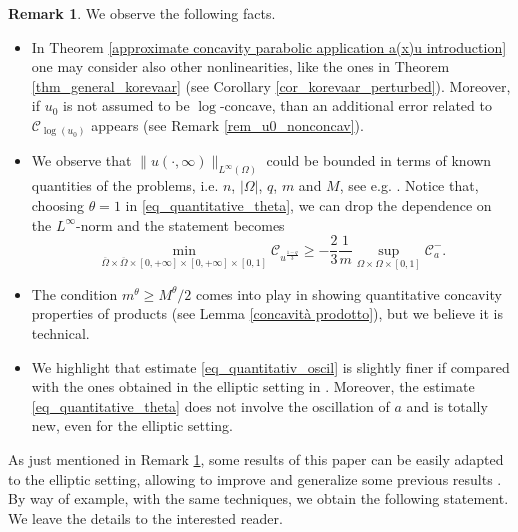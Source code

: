 \documentclass[11pt, reqno]{amsart}
\theoremstyle{definition}
\newtheorem{remark}[lemma]{Remark}
\numberwithin{equation}{section}
\newcommand{\Omegabar}{\overline{\Omega}}
\newcommand{\mc}[1]{\mathcal{#1}}
\def\norm#1{\|#1\|}
\begin{document}
\begin{remark}\label{rmk quantitative concavity introduction}
We observe the following facts.
\begin{itemize}
\item In Theorem \ref{approximate concavity parabolic application a(x)u introduction} one may consider also other nonlinearities, like the ones in Theorem \ref{thm_general_korevaar} (see Corollary \ref{cor_korevaar_perturbed}).
Moreover, if $u_0$ is not assumed to be $\log$-concave, than an additional error related to $\mc{C}_{\log(u_0)}$ appears (see Remark \ref{rem_u0_nonconcav}).
\item 
We observe that $ \norm{u(\cdot, \infty)}_{L^{\infty}(\Omega)}$ could be bounded in terms of known quantities of the problems, i.e. $n$, $|\Omega|$, $q$, $m$ and $M$, see e.g. \cite[proof of Corollary 1.4(b)]{Ciraolo-Cozzi-Perugini-Pollastro}.
Notice that, choosing $\theta=1$ in \eqref{eq_quantitative_theta}, we can drop the dependence on the $L^{\infty}$-norm and the statement becomes
\begin{equation*}
	\min_{\Omegabar\times \Omegabar\times[0,+\infty]\times [0,+\infty]\times[0,1]}\mathcal{C}_{u^{\frac{1-q}{3}}}
	\geq
	-\frac{2}{3} \frac{1}{m} 
\sup\limits_{\Omega \times \Omega\times[0,1]}
\mathcal{C}^-_{a}.
\end{equation*}
\item The condition $m^\theta\geq M^{\theta}/2$ comes into play in showing quantitative concavity properties of products (see Lemma \ref{concavità prodotto}), but we believe it is technical.
\item We highlight that estimate \eqref{eq_quantitativ_oscil} is slightly finer if compared with the ones obtained in the elliptic setting in \cite{BuSq19, GaSq24}. 
Moreover, the estimate \eqref{eq_quantitative_theta} does not involve the oscillation of $a$ and is totally new, even for the elliptic setting. 
\end{itemize}
\end{remark}

As just mentioned in Remark \ref{rmk quantitative concavity introduction}, some results of this paper can be easily adapted to the elliptic setting, allowing to improve and generalize some previous results \cite{BuSq19, GaSq24}. 
By way of example, with the same techniques, we obtain the following statement. We leave the details to the interested reader.
\end{document}
